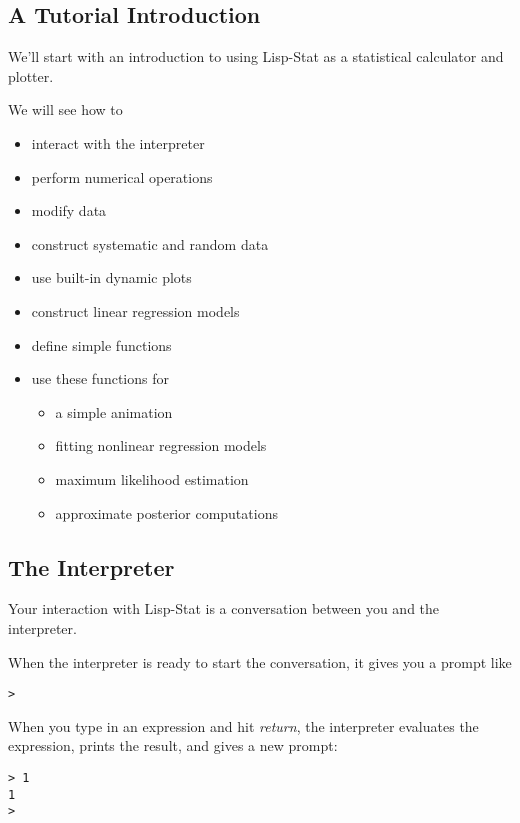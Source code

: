 \begin{slide}{}
\chapter{A Tutorial Introduction}
\end{slide}

\begin{slide}{}
We'll start with an introduction to using Lisp-Stat as a statistical
calculator and plotter.

We will see how to
\begin{itemize}
\item interact with the interpreter
\item perform numerical operations
\item modify data
\item construct systematic and random data
\item use built-in dynamic plots
\item construct linear regression models
\item define simple functions
\item use these functions for
\begin{itemize}
\item a simple animation
\item fitting nonlinear regression models
\item maximum likelihood estimation
\item approximate posterior computations
\end{itemize}
\end{itemize}
\end{slide}

\begin{slide}{}
\section{The Interpreter}
Your interaction with Lisp-Stat is a conversation between you and the
interpreter.

When the interpreter is ready to start the conversation, it gives you
a prompt like
\begin{verbatim}
>
\end{verbatim}
When you type in an expression and hit {\em return}, the interpreter
evaluates the expression, prints the result, and gives a new prompt:
\begin{verbatim}
> 1
1
>
\end{verbatim}
\end{slide}

